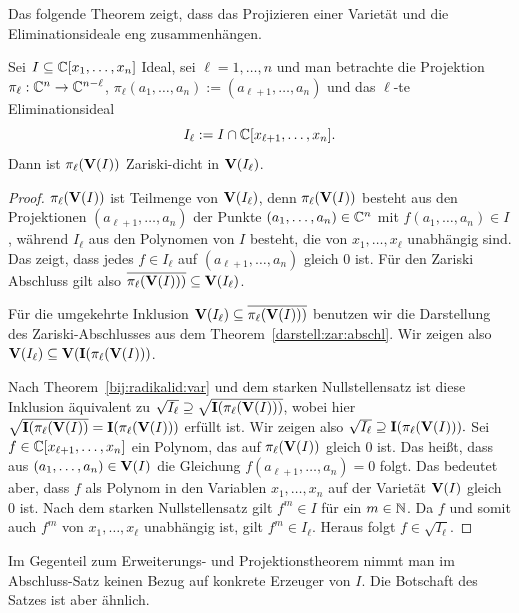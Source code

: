 \documentclass[11pt]{article}
\numberwithin{equation}{section}
\begin{document}
Das folgende Theorem zeigt, dass das Projizieren einer Varietät und die Eliminationsideale eng zusammenhängen. 

\begin{theorem}
	Sei $I \subseteq \mathbb{C}[x_1,\ldots,x_n]$ Ideal, sei $\ell =1,\ldots,n$ und man betrachte die Projektion $\pi_\ell : \mathbb{C}^n \to \mathbb{C}^{n-\ell}$,  $\pi_\ell(a_1,\ldots,a_n) := (a_{\ell+1},\ldots,a_n)$ und das $\ell$-te Eliminationsideal 
	\[
			I_\ell := I \cap \mathbb{C}[x_{\ell+1},\ldots,x_n].
	\]
	Dann ist $\pi_\ell(\mathbf{V}(I))$ Zariski-dicht in $\mathbf{V}(I_\ell)$. 
\end{theorem} 
\begin{proof}
	$\pi_\ell(\mathbf{V}(I))$ ist Teilmenge von $\mathbf{V}(I_\ell)$, denn $\pi_\ell(\mathbf{V}(I))$ besteht aus den Projektionen $(a_{\ell+1},\ldots,a_n)$ der Punkte $(a_1,\ldots,a_n) \in \mathbb{C}^n$ mit $f(a_1,\ldots,a_n) \in I$, während $I_\ell$ aus den Polynomen von $I$ besteht, die von $x_1,\ldots,x_\ell$ unabhängig sind. Das zeigt, dass jedes $f \in I_\ell$ auf  $(a_{\ell+1},\ldots,a_n)$ gleich $0$ ist. Für den Zariski Abschluss gilt also $\overline{ \pi_\ell (\mathbf{V}(I))) } \subseteq \mathbf{V}(I_\ell)$. 
	
	Für die umgekehrte Inklusion $\mathbf{V}(I_\ell) \subseteq \overline{ \pi_\ell (\mathbf{V}(I))) }$  benutzen wir die Darstellung des Zariski-Abschlusses aus dem Theorem~\ref{darstell:zar:abschl}. Wir zeigen also $\mathbf{V}(I_\ell) \subseteq \mathbf{V}( \mathbf{I}( \pi_\ell(\mathbf{V}(I)))$. 
	
	
	Nach Theorem~\ref{bij:radikalid:var} und dem starken Nullstellensatz ist diese Inklusion äquivalent zu $\sqrt{ I_\ell } \supseteq \sqrt{ \mathbf{I}( \pi_\ell(\mathbf{V}(I)))}$, wobei hier $ \sqrt{ \mathbf{I}( \pi_\ell(\mathbf{V}(I))} =  \mathbf{I}(\pi_\ell(\mathbf{V}(I)))$ erfüllt ist. Wir zeigen also $\sqrt{I_\ell} \supseteq \mathbf{I}(\pi_\ell(\mathbf{V}(I))).$ Sei $f \in \mathbb{C}[x_{\ell+1},\ldots,x_n]$ ein Polynom, das auf $\pi_\ell(\mathbf{V}(I))$ gleich $0$ ist.
	Das heißt, dass aus $(a_1,\ldots,a_n) \in \mathbf{V}(I)$ die Gleichung $f(a_{\ell+1},\ldots, a_n) = 0$ folgt. Das bedeutet aber, dass $f$ als Polynom in den Variablen $x_1,\ldots,x_n$ auf der Varietät $\mathbf{V}(I)$ gleich $0$ ist. Nach dem starken Nullstellensatz gilt $f^m \in I$ für ein $m \in \mathbb{N}$. Da $f$ und somit auch $f^m$ von $x_1,\ldots,x_\ell$ unabhängig ist, gilt $f^m \in I_\ell$. Heraus folgt $f \in \sqrt{I_\ell}$. 
\end{proof} 

Im Gegenteil zum Erweiterungs- und Projektionstheorem nimmt man im Abschluss-Satz keinen Bezug auf konkrete Erzeuger von $I$. Die Botschaft des Satzes ist aber ähnlich. 
\end{document}
